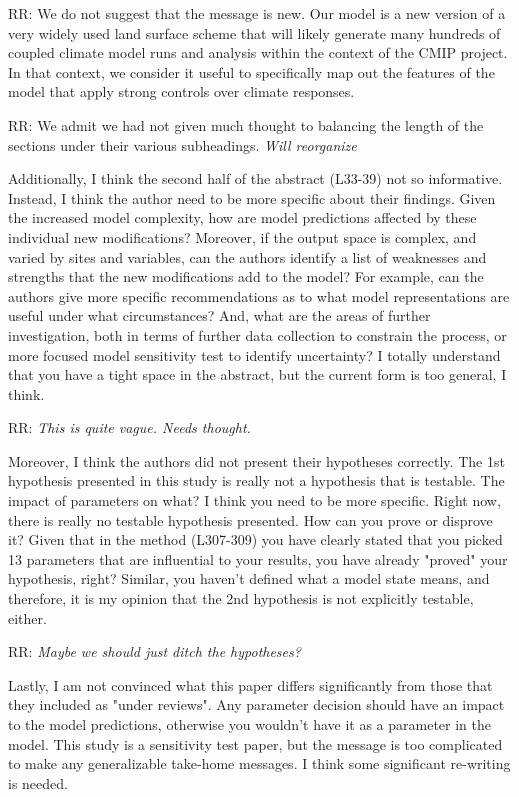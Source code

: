 \documentclass{article}
\begin{document}
RR: We do not suggest that the message is new. Our model is a new version of a very widely used land surface scheme that will likely generate many hundreds of coupled climate model runs and analysis within the context of the CMIP project. In that context, we consider it useful to specifically map out the features of the model that apply strong controls over climate responses. 

RR: We admit we had not given much thought to balancing the length of the sections under their various subheadings. \emph{Will reorganize}

Additionally, I think the second half of the abstract (L33-39) not so informative. Instead, I think the author need to be more specific about their findings. Given the increased model complexity, how are model predictions affected by these individual new modifications? Moreover, if the output space is complex, and varied by sites and variables, can the authors identify a list of weaknesses and strengths that the new modifications add to the model? For example, can the authors give more specific recommendations as to what model representations are useful under what circumstances? And, what are the areas of further investigation, both in terms of further data collection to constrain the process, or more focused model sensitivity test to identify uncertainty? I totally understand that you have a tight space in the abstract, but the current form is too general, I think. 

RR: \emph{This is quite vague. Needs thought. }


Moreover, I think the authors did not present their hypotheses correctly. The 1st hypothesis presented in this study is really not a hypothesis that is testable. The impact of parameters on what? I think you need to be more specific. Right now, there is really no testable hypothesis presented. How can you prove or disprove it? Given that in the method (L307-309) you have clearly stated that you picked 13 parameters that are influential to your results, you have already "proved" your hypothesis, right? Similar, you haven't defined what a model state means, and therefore, it is my opinion that the 2nd hypothesis is not explicitly testable, either. 

RR: \emph{Maybe we should just ditch the hypotheses? }

Lastly, I am not convinced what this paper differs significantly from those that they included as "under reviews". Any parameter decision should have an impact to the model predictions, otherwise you wouldn't have it as a parameter in the model. This study is a sensitivity test paper, but the message is too complicated to make any generalizable take-home messages. I think some significant re-writing is needed. 
\end{document}
